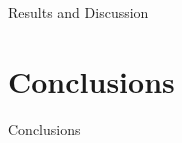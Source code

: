 \documentclass{article}
\begin{document}
Results and Discussion


%


\section{Conclusions}
Conclusions
\label{sec:conclusions}


 


\vfill
\pagebreak



\end{document}

